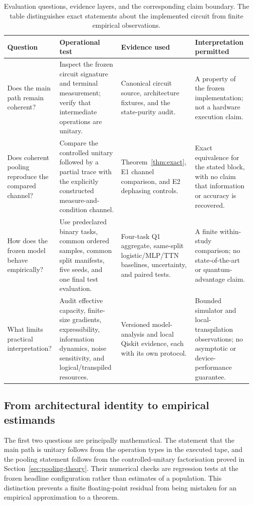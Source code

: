 \documentclass[conference]{IEEEtran}
\begin{document}
\begin{table}[!t]
\caption{Evaluation questions, evidence layers, and the corresponding claim boundary. The table distinguishes exact statements about the implemented circuit from finite empirical observations.}
\label{tab:questions}
\centering
\small
\begin{tabular}{@{}p{}p{}p{}p{}@{}}
\toprule
\textbf{Question} & \textbf{Operational test} & \textbf{Evidence used} & \textbf{Interpretation permitted} \\
\midrule
Does the main path remain coherent? & Inspect the frozen circuit signature and terminal measurement; verify that intermediate operations are unitary. & Canonical circuit source, architecture fixtures, and the state-purity audit. & A property of the frozen implementation; not a hardware execution claim. \\
Does coherent pooling reproduce the compared channel? & Compare the controlled unitary followed by a partial trace with the explicitly constructed measure-and-condition channel. & Theorem~\ref{thm:exact}, E1 channel comparison, and E2 dephasing controls. & Exact equivalence for the stated block, with no claim that information or accuracy is recovered. \\
How does the frozen model behave empirically? & Use predeclared binary tasks, common ordered samples, common split manifests, five seeds, and one final test evaluation. & Four-task Q1 aggregate, same-split logistic/MLP/TTN baselines, uncertainty, and paired tests. & A finite within-study comparison; no state-of-the-art or quantum-advantage claim. \\
What limits practical interpretation? & Audit effective capacity, finite-size gradients, expressibility, information dynamics, noise sensitivity, and logical/transpiled resources. & Versioned model-analysis and local Qiskit evidence, each with its own protocol. & Bounded simulator and local-transpilation observations; no asymptotic or device-performance guarantee. \\
\bottomrule
\end{tabular}
\end{table}

\subsection{From architectural identity to empirical estimands}
The first two questions are principally mathematical. The statement that the
main path is unitary follows from the operation types in the executed tape, and
the pooling statement follows from the controlled-unitary factorisation proved
in Section~\ref{sec:pooling-theory}. Their numerical checks are regression tests
at the frozen headline configuration rather than estimates of a population.
This distinction prevents a finite floating-point residual from being mistaken
for an empirical approximation to a theorem.
\end{document}
